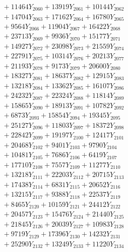 \documentclass[a4paper,10pt]{article}
\begin{document}
{\begin{align}
&\;  + 11464 Y_{2060} + 13919 Y_{2061} + 10144 Y_{2062} \\[0.3ex]
&\;  + 14704 Y_{2063} + 17162 Y_{2064} + 16780 Y_{2065} \\[0.3ex]
&\;  + 9564 Y_{2066} + 11904 Y_{2067} + 16422 Y_{2068} \\[0.5ex]\allowbreak
&\;  + 23713 Y_{2069} + 9936 Y_{2070} + 15177 Y_{2071} \\[0.3ex]
&\;  + 14927 Y_{2072} + 23098 Y_{2073} + 21559 Y_{2074} \\[0.3ex]
&\;  + 22791 Y_{2075} + 10314 Y_{2076} + 20213 Y_{2077} \\[0.3ex]
&\;  + 21193 Y_{2078} + 9173 Y_{2079} + 20600 Y_{2080} \\[0.3ex]
&\;  + 18327 Y_{2081} + 18637 Y_{2082} + 12915 Y_{2083} \\[0.3ex]
&\;  + 13218 Y_{2084} + 13362 Y_{2085} + 16107 Y_{2086} \\[0.3ex]
&\;  + 24232 Y_{2087} + 22324 Y_{2088} + 11814 Y_{2089} \\[0.3ex]
&\;  + 15865 Y_{2090} + 18913 Y_{2091} + 10782 Y_{2092} \\[0.3ex]
&\;  + 6873 Y_{2093} + 15854 Y_{2094} + 19345 Y_{2095} \\[0.3ex]
&\;  + 25127 Y_{2096} + 11803 Y_{2097} + 18372 Y_{2098} \\[0.5ex]\allowbreak
&\;  + 22842 Y_{2099} + 19197 Y_{2100} + 12417 Y_{2101} \\[0.3ex]
&\;  + 20468 Y_{2102} + 9401 Y_{2103} + 9790 Y_{2104} \\[0.3ex]
&\;  + 10481 Y_{2105} + 7686 Y_{2106} + 6419 Y_{2107} \\[0.3ex]
&\;  + 17710 Y_{2108} + 7557 Y_{2109} + 11277 Y_{2110} \\[0.3ex]
&\;  + 13218 Y_{2111} + 22203 Y_{2112} + 20715 Y_{2113} \\[0.3ex]
&\;  + 17438 Y_{2114} + 6831 Y_{2115} + 20652 Y_{2116} \\[0.3ex]
&\;  + 13215 Y_{2117} + 9388 Y_{2118} + 22537 Y_{2119} \\[0.3ex]
&\;  + 8465 Y_{2120} + 10159 Y_{2121} + 24412 Y_{2122} \\[0.3ex]
&\;  + 20457 Y_{2123} + 15476 Y_{2124} + 21440 Y_{2125} \\[0.3ex]
&\;  + 21845 Y_{2126} + 20039 Y_{2127} + 10983 Y_{2128} \\[0.5ex]\allowbreak
&\;  + 9719 Y_{2129} + 17396 Y_{2130} + 14232 Y_{2131} \\[0.3ex]
&\;  + 25290 Y_{2132} + 13249 Y_{2133} + 11220 Y_{2134} \\[0.3ex]

\end{align}}
\end{document}
